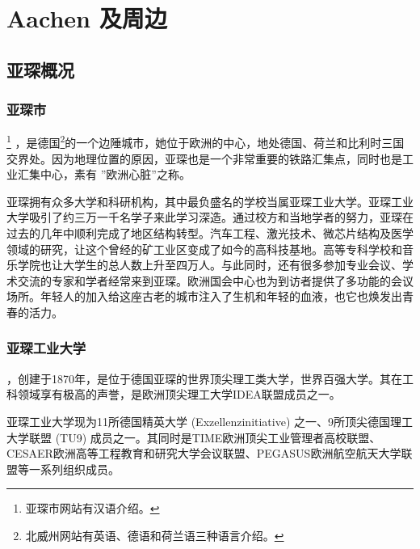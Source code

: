 
\chapter{Aachen 及周边}\label{chap:Aachen 及周边}

\section{亚琛概况}\label{sec:亚琛概况}

  \subsection{亚琛市}\label{subsec:亚琛市}

    \href{https://www.aachen.de/CHIN/kurzinfo.html}{}\footnote{亚琛市网站有汉语介绍。} ，是德国\href{https://www.land.nrw/en/welcome}{}\footnote{北威州网站有英语、德语和荷兰语三种语言介绍。}的一个边陲城市，她位于欧洲的中心，地处德国、荷兰和比利时三国交界处。因为地理位置的原因，亚琛也是一个非常重要的铁路汇集点，同时也是工业汇集中心，素有 ”欧洲心脏”之称。

    亚琛拥有众多大学和科研机构，其中最负盛名的学校当属亚琛工业大学。亚琛工业大学吸引了约三万一千名学子来此学习深造。通过校方和当地学者的努力，亚琛在过去的几年中顺利完成了地区结构转型。汽车工程、激光技术、微芯片结构及医学领域的研究，让这个曾经的矿工业区变成了如今的高科技基地。高等专科学校和音乐学院也让大学生的总人数上升至四万人。与此同时，还有很多参加专业会议、学术交流的专家和学者经常来到亚琛。欧洲国会中心也为到访者提供了多功能的会议场所。年轻人的加入给这座古老的城市注入了生机和年轻的血液，也它也焕发出青春的活力。

  \subsection{亚琛工业大学}\label{subsec:亚琛工业大学}

    \href{https://www.rwth-aachen.de/go/id/a/?lidx=1}{}，创建于1870年，是位于德国亚琛的世界顶尖理工类大学，世界百强大学。其在工科领域享有极高的声誉，是欧洲顶尖理工大学IDEA联盟成员之一。

    亚琛工业大学现为11所德国精英大学 (Exzellenzinitiative) 之一、9所顶尖德国理工大学联盟 (TU9) 成员之一。其同时是TIME欧洲顶尖工业管理者高校联盟、CESAER欧洲高等工程教育和研究大学会议联盟、PEGASUS欧洲航空航天大学联盟等一系列组织成员。

